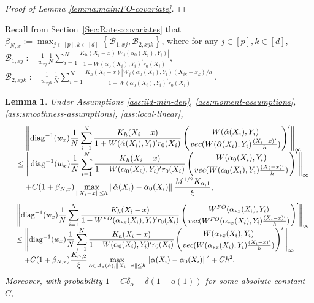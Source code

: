 \documentclass[11pt]{article}
\newtheorem{lemma}{Lemma}
\newcommand{\norm}[1]{\left\lVert #1 \right\rVert}
\begin{document}
\begin{proof}[Proof of Lemma \ref{lemma:main:FO-covariate}]
\end{proof}

Recall from Section~\ref{Sec:Rates:covariates} that $\beta_{N,x}:={\displaystyle\max_{j\in[p],k\in[d]}}\left\{\mathcal{B}_{1,xj},\mathcal{B}_{2,xjk}\right\}$, where for any $j\in[p], k\in[d]$, $\mathcal{B}_{1,xj}:=\frac{1}{w_{xj}}\frac{1}{N}\sum_{i=1}^N\frac{K_h(X_i-x)|W_j(\alpha_0(X_i),Y_i)|}{1+W(\alpha_0(X_i),Y_i)^\prime r_0(X_i)}$, $\mathcal{B}_{2,xjk}:=\frac{1}{w_{xjk}}\frac{1}{N}\sum_{i=1}^N\frac{K_h(X_i-x)|W_j(\alpha_0(X_i),Y_i)(X_{ik}-x_k)/h|}{1+W(\alpha_0(X_i),Y_i)^\prime r_0(X_i)}$. 
\begin{lemma}\label{lemma:choice of lambda:covariate}
Under Assumptions \ref{ass:iid-min-den}, \ref{ass:moment-assumptions}, \ref{ass:smoothness-assumptions}, \ref{ass:local-linear}, 
$$\begin{array}{rl}
&\displaystyle\quad\left\|\mathrm{diag}^{-1}(w_x)\frac{1}{N}\sum_{i=1}^N\frac{  K_h(X_i-x) }{1+W(\hat{\alpha}(X_i),Y_i)^\prime r_0(X_i)} \left( { W(\hat{\alpha}(X_i),Y_i)}\atop{ {\rm vec}( W(\hat{\alpha}(X_i),Y_i)\frac{(X_i-x)'}{h} )}\right)^\prime \right\|_\infty \\
&\displaystyle\leq\left\|\mathrm{diag}^{-1}(w_x)\frac{1}{N}\sum_{i=1}^N\frac{  K_h(X_i-x) }{1+W(\alpha_0(X_i),Y_i)^\prime r_0(X_i)} \left( { W(\alpha_0(X_i),Y_i)}\atop{ {\rm vec}( W(\alpha_0(X_i),Y_i)\frac{(X_i-x)'}{h} )}\right)^\prime \right\|_\infty\\
&\displaystyle\quad+C(1+\beta_{N,x})\max_{\|X_i-x\|\leq h}\norm{\hat{\alpha}(X_i)-\alpha_0(X_i)}\frac{M^{1/2}K_{\alpha,1}}{\xi},
\end{array}$$
$$\begin{array}{rl}
&\displaystyle\left\|\mathrm{diag}^{-1}(w_x)\frac{1}{N}\sum_{i=1}^N\frac{  K_h(X_i-x) }{1+W^{FO}(\alpha_{*x}(X_i),Y_i)^\prime r_0(X_i)} \left( { W^{FO}(\alpha_{*x}(X_i),Y_i)}\atop{ {\rm vec}( W^{FO}(\alpha_{*x}(X_i),Y_i)\frac{(X_i-x)'}{h} )}\right)^\prime \right\|_\infty \\
&\displaystyle\leq\left\|\mathrm{diag}^{-1}(w_x)\frac{1}{N}\sum_{i=1}^N\frac{ K_h(X_i-x) }{1+W(\alpha_0(X_i),Y_i)^\prime r_0(X_i)} \left( { W(\alpha_{*x}(X_i),Y_i)}\atop{ {\rm vec}( W(\alpha_{*x}(X_i),Y_i)\frac{(X_i-x)'}{h} )}\right)^\prime \right\|_\infty\\
&\displaystyle\quad+C(1+\beta_{N,x})\frac{K_{\alpha,2}}{\xi}\max_{\alpha \in \mathcal{A}_x(\hat\alpha), \|X_i-x\|\leq h}\norm{\alpha(X_i)-\alpha_0(X_i)}^2+Ch^2.
\end{array}$$
Moreover, with probability $1-C\delta_{\alpha}-\delta(1+\mathrm{o}(1))$ for some absolute constant $C$,

\end{lemma}
\end{document}
